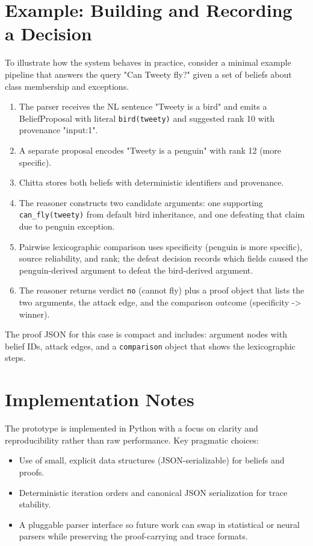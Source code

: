\documentclass[11pt]{article}
\begin{document}
\section{Example: Building and Recording a Decision}
To illustrate how the system behaves in practice, consider a minimal example pipeline
that answers the query "Can Tweety fly?" given a set of beliefs about class membership
and exceptions.

\begin{enumerate}
  \item The parser receives the NL sentence "Tweety is a bird" and emits a BeliefProposal
    with literal \texttt{bird(tweety)} and suggested rank 10 with provenance "input:1".
  \item A separate proposal encodes "Tweety is a penguin" with rank 12 (more specific).
  \item Chitta stores both beliefs with deterministic identifiers and provenance.
  \item The reasoner constructs two candidate arguments: one supporting \texttt{can\_fly(tweety)}
    from default bird inheritance, and one defeating that claim due to penguin exception.
  \item Pairwise lexicographic comparison uses specificity (penguin is more specific),
    source reliability, and rank; the defeat decision records which fields caused the
    penguin-derived argument to defeat the bird-derived argument.
  \item The reasoner returns verdict \texttt{no} (cannot fly) plus a proof object that
    lists the two arguments, the attack edge, and the comparison outcome (specificity -> winner).
\end{enumerate}

The proof JSON for this case is compact and includes: argument nodes with belief IDs,
attack edges, and a \texttt{comparison} object that shows the lexicographic steps.

\section{Implementation Notes}
The prototype is implemented in Python with a focus on clarity and reproducibility rather
than raw performance. Key pragmatic choices:
\begin{itemize}
  \item Use of small, explicit data structures (JSON-serializable) for beliefs and proofs.
  \item Deterministic iteration orders and canonical JSON serialization for trace stability.
  \item A pluggable parser interface so future work can swap in statistical or neural
    parsers while preserving the proof-carrying and trace formats.
\end{itemize}
\end{document}
